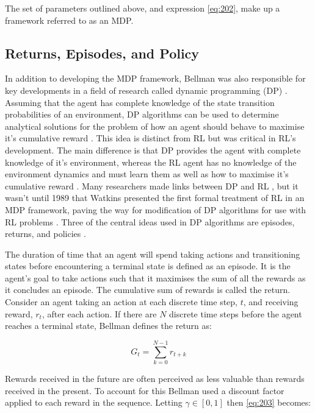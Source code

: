 The set of parameters outlined above, and expression \ref{eq:202}, make up a framework referred to as an MDP.


\subsection{Returns, Episodes, and Policy} \label{rep}
In addition to  developing the MDP framework, Bellman was also responsible for key developments in a field of research called dynamic programming (DP) \cite{Bellm1954}. Assuming that the agent has complete knowledge of the state transition probabilities of an environment, DP algorithms can be used to determine analytical solutions for the problem of how an agent should behave to maximise it's cumulative reward \cite{Bellm1954, Howard1960}. This idea is distinct from RL but was critical in RL's development. The main difference is that DP provides the agent with complete knowledge of it's environment, whereas the RL agent has no knowledge of the environment dynamics and must learn them as well as how to maximise it's cumulative reward \cite{Sutton2018}. Many researchers made links between DP and RL \cite{Bellm1959, Witten1977, Werbos1987}, but it wasn't until 1989 that Watkins presented the first formal treatment of RL in an MDP framework, paving the way for modification of DP algorithms for use with RL problems \cite{Watkins1989}. Three of the central ideas used in DP algorithms are episodes, returns, and policies \cite{Sutton2018}.

The duration of time that an agent will spend taking actions and transitioning states before encountering a terminal state is defined as an episode. It is the agent's goal to take actions such that it maximises the sum of all the rewards as it concludes an episode. The cumulative sum of rewards is called the return. Consider an agent taking an action at each discrete time step, $t$, and receiving reward, $r_t$, after each action. If there are $N$ discrete time steps before the agent reaches a terminal state, Bellman defines the return as:

\begin{equation}
	G_t = \sum_{k = 0}^{N-1} r_{t + k} \label{eq:203}
\end{equation}

Rewards received in the future are often perceived as less valuable than rewards received in the present. To account for this Bellman used a discount factor applied to each reward in the sequence. Letting $\gamma \in [0,1]$ then \ref{eq:203} becomes:

